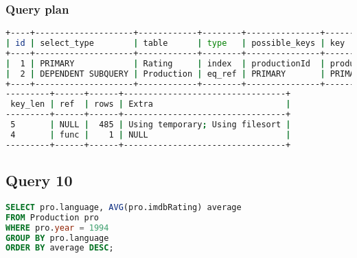 \subsubsection{Query plan}
\begin{lstlisting}[language=bash]
+----+--------------------+------------+--------+---------------+--------------+
| id | select_type        | table      | type   | possible_keys | key          |
+----+--------------------+------------+--------+---------------+--------------+
|  1 | PRIMARY            | Rating     | index  | productionId  | productionId |
|  2 | DEPENDENT SUBQUERY | Production | eq_ref | PRIMARY       | PRIMARY      |
+----+--------------------+------------+--------+---------------+--------------+
---------+------+------+---------------------------------+
 key_len | ref  | rows | Extra                           |
---------+------+------+---------------------------------+
 5       | NULL |  485 | Using temporary; Using filesort |
 4       | func |    1 | NULL                            |
---------+------+------+---------------------------------+
\end{lstlisting}


\bigskip
\subsection{Query 10}
\begin{lstlisting}[language=sql]
SELECT pro.language, AVG(pro.imdbRating) average
FROM Production pro
WHERE pro.year = 1994
GROUP BY pro.language
ORDER BY average DESC;
\end{lstlisting}

